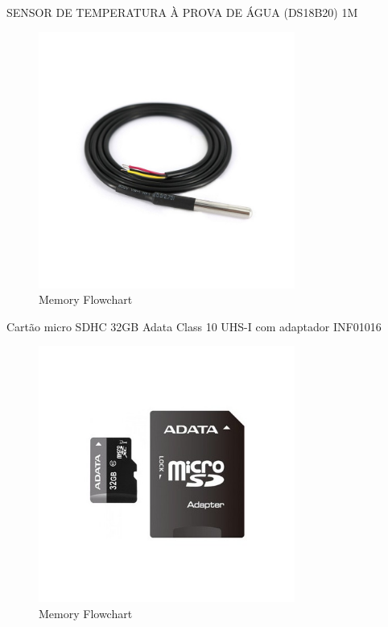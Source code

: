 SENSOR DE TEMPERATURA À PROVA DE ÁGUA (DS18B20) 1M


\begin{figure}[H]
    \centering
    \includegraphics[width=0.75\textwidth]{images/chapter/design/components/temp.png}  %
    \caption{Memory Flowchart}
    \label{fig:Memory Flowchart}        
\end{figure}

Cartão micro SDHC 32GB Adata Class 10 UHS-I com adaptador
INF01016

\begin{figure}[H]
    \centering
    \includegraphics[width=0.75\textwidth]{images/chapter/design/components/sdcard.png}  %
    \caption{Memory Flowchart}
    \label{fig:Memory Flowchart}        
\end{figure}

